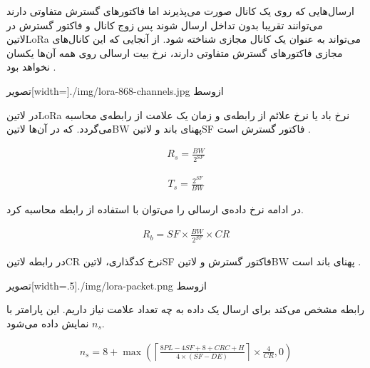 ارسال‌هایی که روی یک کانال صورت می‌پذیرند اما فاکتورهای گسترش متفاوتی دارند می‌توانند تقریبا بدون تداخل ارسال شوند پس زوج کانال و فاکتور گسترش در ‌لاتین{LoRa} می‌تواند به عنوان
یک کانال مجازی شناخته شود. از آنجایی که این کانال‌های مجازی فاکتورهای گسترش متفاوتی دارند، نرخ بیت ارسالی روی همه آن‌ها یکسان نخواهد بود
.

‌تصویر[width=\textwidth]{./img/lora-868-channels.jpg}
‌ازوسط

در ‌لاتین{LoRa} نرخ باد یا نرخ علائم از رابطه‌ی 
و زمان یک علامت از رابطه‌ی 
محاسبه می‌گردد.
که در آن‌ها ‌لاتین{BW} پهنای باند و ‌لاتین{SF} فاکتور گسترش است
.

\begin{align}
  \label{معادله: نرخ باد یا علائم در LoRa}
  R_{s} = \frac{BW}{2^{SF}}
\end{align}

\begin{align}
  \label{معادله: زمان علامت در LoRa}
  T_{s} = \frac{2^{SF}}{BW}
\end{align}

در ادامه نرخ داده‌ی ارسالی را می‌توان با استفاده از رابطه  محاسبه کرد.

\begin{align}
  \label{معادله: نرخ داده در LoRa}
  R_{b} = SF \times \frac{BW}{2^{SF}} \times CR
\end{align}

در رابطه  ‌لاتین{CR} نرخ کدگذاری، ‌لاتین{SF} فاکتور گسترش و ‌لاتین{BW} پهنای باند است
.

‌تصویر[width=.5\textwidth]{./img/lora-packet.png}
‌ازوسط

رابطه  مشخص می‌کند برای ارسال یک داده به چه تعداد علامت نیاز داریم. این پارامتر با $n_{s}$ نمایش داده می‌شود.

\begin{align}
  \label{معادله: تعداد علائم مورد نیاز در LoRa}
  n_{s} = 8 + \max\left( \left\lceil \frac{8PL - 4SF + 8 + CRC + H}{4 \times (SF - DE)} \right\rceil \times \frac{4}{CR}, 0 \right)
\end{align}

